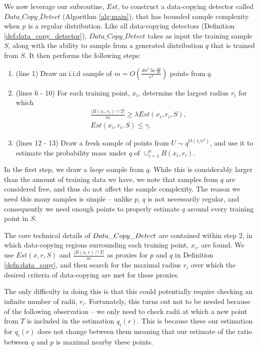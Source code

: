 We now leverage our subroutine, $Est$, to construct a data-copying detector called  $Data\_Copy\_Detect$ (Algorithm \ref{alg:main}), that has bounded sample complexity when $p$ is a regular distribution. Like all data-copying detectors (Definition \ref{def:data_copy_detector}), $Data\_Copy\_Detect$ takes as input the training sample $S$, along with the ability to sample from a generated distribution $q$ that is trained from $S$. It then performs the following steps:
\begin{enumerate}
	\item (line 1) Draw an i.i.d sample of $m = O\left(\frac{dn^2\ln \frac{nd}{\delta\epsilon}}{\epsilon^4}\right)$ points from $q$. 
	\item (lines 6 - 10) For each training point, $x_i$, determine the largest radius $r_i$ for which 
	\begin{equation*}
	\begin{split}
	&\frac{|B(x_i, r_i) \cap T|}{m} \geq \lambda Est(x_i, r_i ,S), \\ 
	&Est(x_i, r_i , S) \leq \gamma.
	\end{split}
	\end{equation*}
	\item (lines 12 - 13) Draw a fresh sample of points from $U \sim q^{O(1/\epsilon^2)}$, and use it to estimate the probability mass under $q$ of $\cup_{i=1}^n B(x_i, r_i)$.
\end{enumerate}

In the first step, we draw a \textit{large} sample from $q$. While this is considerably larger than the amount of training data we have, we note that samples from $q$ are considered free, and thus do not affect the sample complexity. The reason we need this many samples is simple -- unlike $p$, $q$ is not necessarily regular, and consequently we need enough points to properly estimate $q$ around every training point in $S$.

The core technical details of $Data\_Copy\_Detect{}$ are contained within step 2, in which data-copying regions surrounding each training point, $x_i$, are found. We use $Est(x, r, S)$ and $\frac{|B(x, r) \cap T|}{m}$ as proxies for $p$ and $q$ in Definition \ref{defn:data_copy}, and then search for the maximal radius $r_i$ over which the desired criteria of data-copying are met for these proxies.  

The only difficulty in doing this is that this could potentially require checking an infinite number of radii, $r_i$. Fortunately, this turns out not to be needed because of the following observation -- we only need to check radii at which a new point from $T$ is included in the estimation $q_i(r)$. This is because these our estimation for $q_i(r)$ does not change between them meaning that our estimate of the ratio between $q$ and $p$ is maximal nearby these points. 

